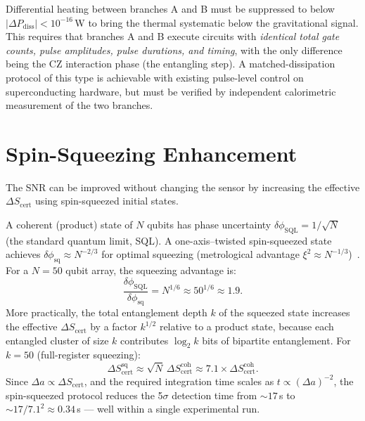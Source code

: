 \documentclass[11pt,letterpaper]{article}
\newcommand{\Scert}{S_{\mathrm{cert}}}
\begin{document}
\begin{warningbox}
Differential heating between branches A and B must be suppressed to below
$|\Delta P_{\mathrm{diss}}| < 10^{-16}$\,W to bring the thermal systematic below the
gravitational signal.  This requires that branches A and B execute circuits with
\emph{identical total gate counts, pulse amplitudes, pulse durations, and timing},
with the only difference being the CZ interaction phase (the entangling step).
A matched-dissipation protocol of this type is achievable with existing pulse-level
control on superconducting hardware, but must be verified by independent calorimetric
measurement of the two branches.
\end{warningbox}

\section{Spin-Squeezing Enhancement}

The SNR can be improved without changing the sensor by increasing the effective
$\Delta\Scert$ using spin-squeezed initial states.

A coherent (product) state of $N$ qubits has phase uncertainty $\delta\phi_{\mathrm{SQL}}
= 1/\sqrt{N}$ (the standard quantum limit, SQL).  A one-axis--twisted spin-squeezed
state achieves $\delta\phi_{\mathrm{sq}} \approx N^{-2/3}$ for optimal squeezing
(metrological advantage $\xi^2 \approx N^{-1/3}$)~\cite{Kitagawa1993}.  For a
$N=50$ qubit array, the squeezing advantage is:
\begin{equation}
  \frac{\delta\phi_{\mathrm{SQL}}}{\delta\phi_{\mathrm{sq}}}
  = N^{1/6} \approx 50^{1/6} \approx 1.9.
\end{equation}
More practically, the total entanglement depth $k$ of the squeezed state increases
the effective $\Delta\Scert$ by a factor $k^{1/2}$ relative to a product state,
because each entangled cluster of size $k$ contributes $\log_2 k$ bits of
bipartite entanglement.  For $k = 50$ (full-register squeezing):
\begin{equation}
  \Delta\Scert^{\mathrm{sq}} \approx \sqrt{N}\,\Delta\Scert^{\mathrm{coh}}
  \approx 7.1\times\Delta\Scert^{\mathrm{coh}}.
\end{equation}
Since $\Delta a \propto \Delta\Scert$, and the required integration time scales as
$t \propto (\Delta a)^{-2}$, the spin-squeezed protocol reduces the 5$\sigma$
detection time from $\sim 17$\,s to $\sim 17/7.1^2 \approx 0.34$\,s --- well within
a single experimental run.
\end{document}
